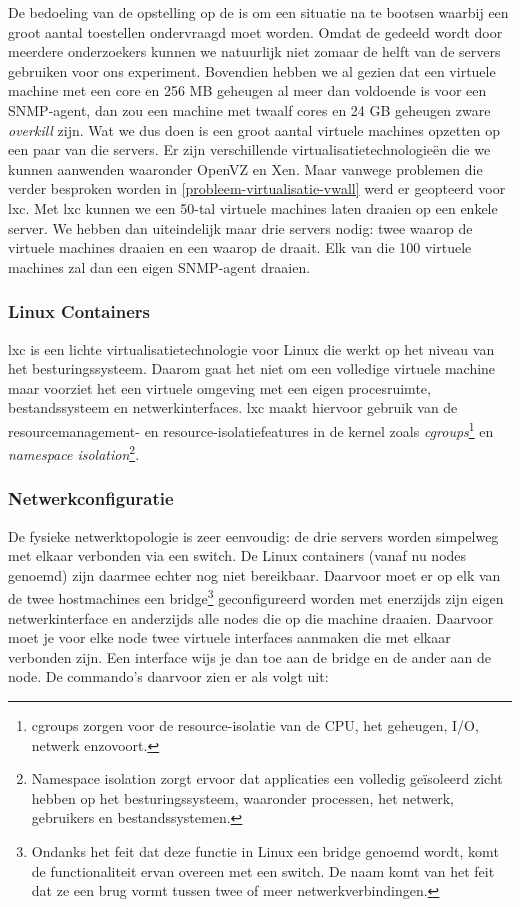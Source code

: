 De bedoeling van de opstelling op de \vwall{}  is om een situatie na te bootsen waarbij een groot aantal toestellen ondervraagd moet worden.
Omdat de \vwall{} gedeeld wordt door meerdere onderzoekers kunnen we natuurlijk niet zomaar de helft van de servers gebruiken voor ons experiment.
Bovendien hebben we al gezien dat een virtuele machine met een core en 256 MB geheugen al meer dan voldoende is voor een SNMP-agent,
dan zou een machine met twaalf cores en 24 GB geheugen zware \textit{overkill} zijn.
Wat we dus doen is een groot aantal virtuele machines opzetten op een paar van die servers.
Er zijn verschillende virtualisatietechnologieën die we kunnen aanwenden waaronder OpenVZ en Xen.
Maar vanwege problemen die verder besproken worden in \cref{probleem-virtualisatie-vwall} werd er geopteerd voor \gls{lxc}.
Met \gls{lxc} kunnen we een 50-tal virtuele machines laten draaien op een enkele server.
We hebben dan uiteindelijk maar drie servers nodig: twee waarop de virtuele machines draaien en een waarop de \nwmretriever{} draait.
Elk van die 100 virtuele machines zal dan een eigen SNMP-agent draaien.

\subsubsection{Linux Containers}

\gls{lxc} is een lichte virtualisatietechnologie voor Linux die werkt op het niveau van het besturingssysteem.
Daarom gaat het niet om een volledige virtuele machine maar voorziet het een virtuele omgeving met een eigen procesruimte, bestandssysteem en netwerkinterfaces.
\gls{lxc} maakt hiervoor gebruik van de resourcemanagement- en resource-isolatiefeatures in de kernel zoals \textit{\gls{cgroups}}\footnote{
	\gls{cgroups} zorgen voor de resource-isolatie van de CPU, het geheugen, I/O, netwerk enzovoort\cite{lxc-wiki}.
} en \textit{namespace isolation}\footnote{
	Namespace isolation zorgt ervoor dat applicaties een volledig geïsoleerd zicht hebben op het besturingssysteem,
	waaronder processen, het netwerk, gebruikers en bestandssystemen\cite{lxc-wiki}.
}\cite{lxc-explained, lxc-wiki}.


\subsubsection{Netwerkconfiguratie}

De fysieke netwerktopologie is zeer eenvoudig: de drie servers worden simpelweg met elkaar verbonden via een switch.
De Linux containers (vanaf nu nodes genoemd) zijn daarmee echter nog niet bereikbaar.
Daarvoor moet er op elk van de twee hostmachines een bridge\footnote{
	Ondanks het feit dat deze functie in Linux een bridge genoemd wordt, komt de functionaliteit ervan overeen met een switch.
	De naam komt van het feit dat ze een brug vormt tussen twee of meer netwerkverbindingen.
} geconfigureerd worden met enerzijds zijn eigen netwerkinterface
en anderzijds alle nodes die op die machine draaien.
Daarvoor moet je voor elke node twee virtuele interfaces aanmaken die met elkaar verbonden zijn.
Een interface wijs je dan toe aan de bridge en de ander aan de node\cite{lxc-config}.
De commando's daarvoor zien er als volgt uit:

